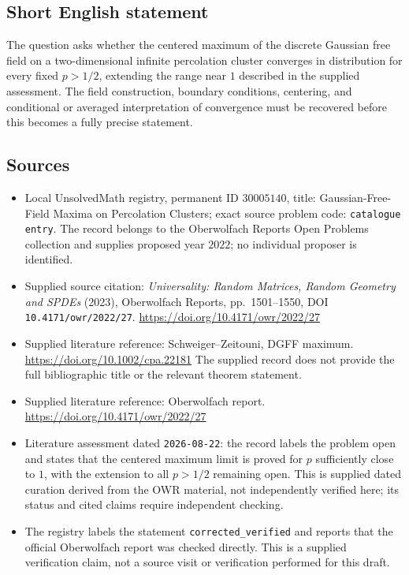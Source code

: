 \documentclass[11pt]{article}
\begin{document}
\subsection{Short English statement}
The question asks whether the centered maximum of the discrete Gaussian free field on a two-dimensional infinite percolation cluster converges in distribution for every fixed \(p>1/2\), extending the range near \(1\) described in the supplied assessment. The field construction, boundary conditions, centering, and conditional or averaged interpretation of convergence must be recovered before this becomes a fully precise statement.
\subsection{Sources}
\begin{itemize}
\item Local UnsolvedMath registry, permanent ID \(30005140\), title: Gaussian-Free-Field Maxima on Percolation Clusters; exact source problem code: \texttt{catalogue entry}. The record belongs to the Oberwolfach Reports Open Problems collection and supplies proposed year \(2022\); no individual proposer is identified.
\item Supplied source citation: \emph{Universality: Random Matrices, Random Geometry and SPDEs} (2023), Oberwolfach Reports, pp.\ 1501--1550, DOI \texttt{10.4171/owr/2022/27}. \url{https://doi.org/10.4171/owr/2022/27}
\item Supplied literature reference: Schweiger--Zeitouni, DGFF maximum. \url{https://doi.org/10.1002/cpa.22181} The supplied record does not provide the full bibliographic title or the relevant theorem statement.
\item Supplied literature reference: Oberwolfach report. \url{https://doi.org/10.4171/owr/2022/27}
\item Literature assessment dated \texttt{2026-08-22}: the record labels the problem open and states that the centered maximum limit is proved for \(p\) sufficiently close to \(1\), with the extension to all \(p>1/2\) remaining open. This is supplied dated curation derived from the OWR material, not independently verified here; its status and cited claims require independent checking.
\item The registry labels the statement \texttt{corrected\_verified} and reports that the official Oberwolfach report was checked directly. This is a supplied verification claim, not a source visit or verification performed for this draft.
\end{itemize}
\end{document}
